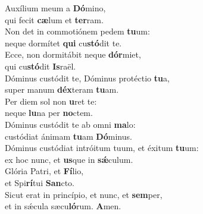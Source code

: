 \evenverse Auxílium meum a \textbf{Dó}mino,~\*\\
\evenverse qui fecit \textbf{cæ}lum et \textbf{ter}ram.\\
\oddverse Non det in commotiónem pedem \textbf{tu}um:~\*\\
\oddverse neque dormítet \textbf{qui} cu\textbf{stó}dit te.\\
\evenverse Ecce, non dormitábit neque \textbf{dór}miet,~\*\\
\evenverse qui cu\textbf{stó}dit \textbf{Is}raël.\\
\oddverse Dóminus custódit te, Dóminus protéctio \textbf{tu}a,~\*\\
\oddverse super manum \textbf{déx}teram \textbf{tu}am.\\
\evenverse Per diem sol non \textbf{u}ret te:~\*\\
\evenverse neque \textbf{lu}na per \textbf{no}ctem.\\
\oddverse Dóminus custódit te ab omni \textbf{ma}lo:~\*\\
\oddverse custódiat ánimam \textbf{tu}am \textbf{Dó}minus.\\
\evenverse Dóminus custódiat intróitum tuum, et éxitum \textbf{tu}um:~\*\\
\evenverse ex hoc nunc, et \textbf{us}que in \textbf{sǽ}culum.\\
\oddverse Glória Patri, et \textbf{Fí}lio,~\*\\
\oddverse et Spi\textbf{rí}tui \textbf{San}cto.\\
\evenverse Sicut erat in princípio, et nunc, et \textbf{sem}per,~\*\\
\evenverse et in sǽcula sæcu\textbf{ló}rum. \textbf{A}men.\\
